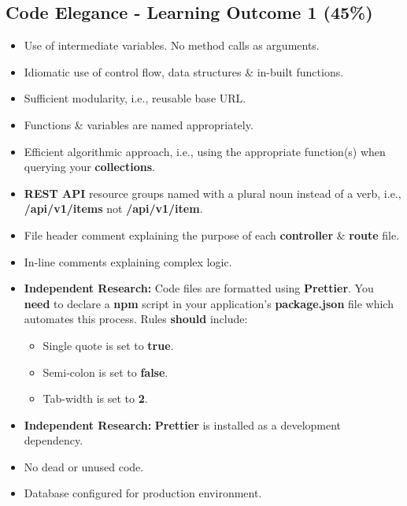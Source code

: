 \documentclass{article}
\begin{document}
\subsection*{Code Elegance - Learning Outcome 1 (45\%)}
\begin{itemize}
	\item Use of intermediate variables. No method calls as arguments.
	\item Idiomatic use of control flow, data structures \& in-built functions.
	\item Sufficient modularity, i.e., reusable base URL.
	\item Functions \& variables are named appropriately.
	\item Efficient algorithmic approach, i.e., using the appropriate function(s) when querying your \textbf{collections}.
	\item \textbf{REST API} resource groups named with a plural noun instead of a verb, i.e., \textbf{/api/v1/items} not \textbf{/api/v1/item}.
	\item File header comment explaining the purpose of each \textbf{controller} \& \textbf{route} file.
	\item In-line comments explaining complex logic.
	\item \textbf{Independent Research:} Code files are formatted using \textbf{Prettier}. You \textbf{need} to declare a \textbf{npm} script in your application's \textbf{package.json} file which automates this process. Rules \textbf{should} include:
	      \begin{itemize}
		      \item Single quote is set to \textbf{true}.
		      \item Semi-colon is set to \textbf{false}.
		      \item Tab-width is set to \textbf{2}.
	      \end{itemize}
	\item \textbf{Independent Research:} \textbf{Prettier} is installed as a development dependency.
	\item No dead or unused code.
	\item Database configured for production environment.
\end{itemize}
\end{document}
